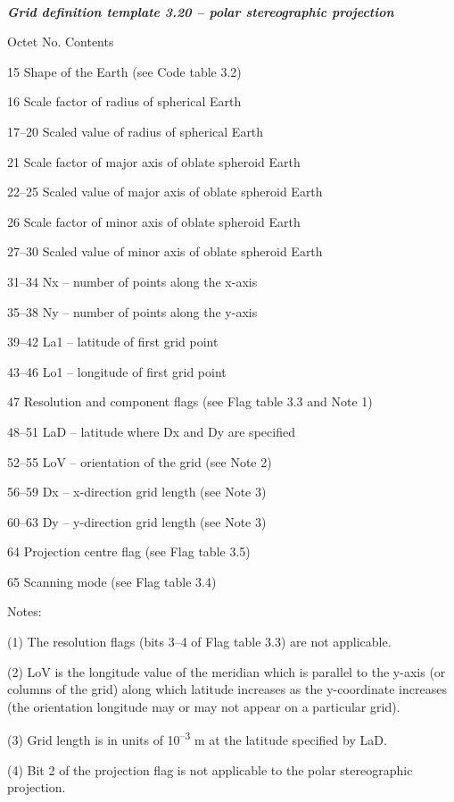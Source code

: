\emph{\textbf{\\
}}

\emph{\textbf{Grid definition template 3.20 -- polar stereographic projection}}

Octet No. Contents

15 Shape of the Earth (see Code table 3.2)

16 Scale factor of radius of spherical Earth

17--20 Scaled value of radius of spherical Earth

21 Scale factor of major axis of oblate spheroid Earth

22--25 Scaled value of major axis of oblate spheroid Earth

26 Scale factor of minor axis of oblate spheroid Earth

27--30 Scaled value of minor axis of oblate spheroid Earth

31--34 Nx -- number of points along the x-axis

35--38 Ny -- number of points along the y-axis

39--42 La1 -- latitude of first grid point

43--46 Lo1 -- longitude of first grid point

47 Resolution and component flags (see Flag table 3.3 and Note 1)

48--51 LaD -- latitude where Dx and Dy are specified

52--55 LoV -- orientation of the grid (see Note 2)

56--59 Dx -- x-direction grid length (see Note 3)

60--63 Dy -- y-direction grid length (see Note 3)

64 Projection centre flag (see Flag table 3.5)

65 Scanning mode (see Flag table 3.4)

Notes:

(1) The resolution flags (bits 3--4 of Flag table 3.3) are not applicable.

(2) LoV is the longitude value of the meridian which is parallel to the y-axis (or columns of the grid) along which latitude increases as the y-coordinate increases (the orientation longitude may or may not appear on a particular grid).

(3) Grid length is in units of 10\textsuperscript{--3} m at the latitude specified by LaD.

(4) Bit 2 of the projection flag is not applicable to the polar stereographic projection.

